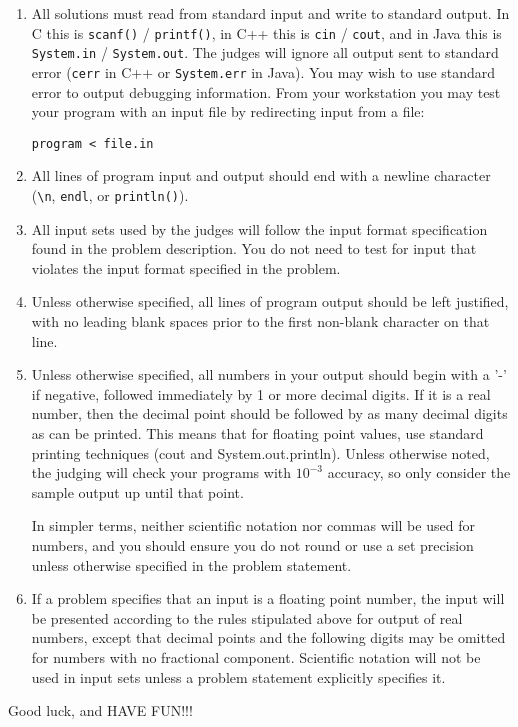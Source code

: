 \begin{enumerate}[resume]

\item All solutions must read from standard input and write to
  standard output. In C this is {\tt scanf()} / {\tt printf()}, in C++
  this is {\tt cin} / {\tt cout}, and in Java this is {\tt System.in}
  / {\tt System.out}. The judges will ignore all output sent to
  standard error ({\tt cerr} in C++ or {\tt System.err} in Java). You
  may wish to use standard error to output debugging information. From
  your workstation you may test your program with an input file by
  redirecting input from a file:

\begin{verbatim}
program < file.in
\end{verbatim}

\item All lines of program input and output should end with a newline
  character ({\tt {\verb$\$}n}, {\tt endl}, or {\tt println()}).

\item All input sets used by the judges will follow the input format
  specification found in the problem description. You do not need to
  test for input that violates the input format specified in the
  problem.

\item Unless otherwise specified, all lines of program output should
  be left justified, with no leading blank spaces prior to the first
  non-blank character on that line.

\item Unless otherwise specified, all numbers in your output should
  begin with a '-' if negative, followed immediately by 1 or more
  decimal digits. If it is a real number, then the decimal point
  should be followed by as many decimal digits as can be printed.
  This means that for floating point values, use standard printing
  techniques (cout and System.out.println). Unless otherwise noted,
  the judging will check your programs with $10^{-3}$ accuracy, so
  only consider the sample output up until that point.

In simpler terms, neither scientific notation nor commas will be used
for numbers, and you should ensure you do not round or use a set
precision unless otherwise specified in the problem statement.

\item If a problem specifies that an input is a floating point number,
  the input will be presented according to the rules stipulated above
  for output of real numbers, except that decimal points and the
  following digits may be omitted for numbers with no fractional component.
    Scientific notation will not be used in input sets unless
  a problem statement explicitly specifies it.

\end{enumerate}

Good luck, and HAVE FUN!!!
